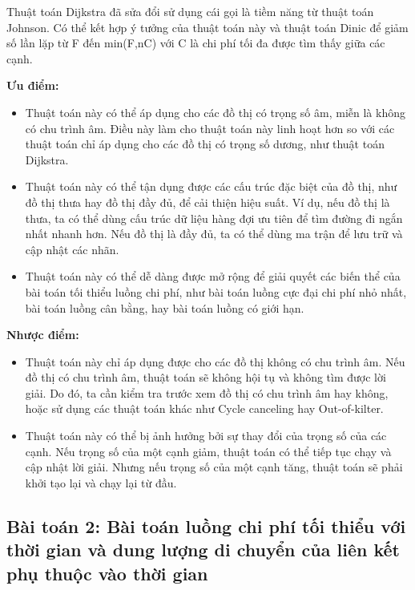 \documentclass[a4paper]{article}
\begin{document}
    Thuật toán Dijkstra đã sửa đổi sử dụng cái gọi là tiềm năng từ thuật toán Johnson. 
    Có thể kết hợp ý tưởng của thuật toán này và thuật toán Dinic để giảm số lần lặp từ F đến min(F,nC) với C là chi phí tối đa được tìm thấy giữa các cạnh.

    \textbf{Ưu điểm:} 
    \begin{itemize}
        \item Thuật toán này có thể áp dụng cho các đồ thị có trọng số âm, miễn là không có chu trình âm. 
            Điều này làm cho thuật toán này linh hoạt hơn so với các thuật toán chỉ áp dụng cho các đồ thị có trọng số dương, như thuật toán Dijkstra.
        \item Thuật toán này có thể tận dụng được các cấu trúc đặc biệt của đồ thị, như đồ thị thưa hay đồ thị đầy đủ, để cải thiện hiệu suất. 
            Ví dụ, nếu đồ thị là thưa, ta có thể dùng cấu trúc dữ liệu hàng đợi ưu tiên để tìm đường đi ngắn nhất nhanh hơn. 
            Nếu đồ thị là đầy đủ, ta có thể dùng ma trận để lưu trữ và cập nhật các nhãn.
        \item Thuật toán này có thể dễ dàng được mở rộng để giải quyết các biến thể của bài toán tối thiểu luồng chi phí, 
        như bài toán luồng cực đại chi phí nhỏ nhất, bài toán luồng cân bằng, hay bài toán luồng có giới hạn.
    \end{itemize}

    \textbf{Nhược điểm:}
    \begin{itemize}
        \item Thuật toán này chỉ áp dụng được cho các đồ thị không có chu trình âm. 
        Nếu đồ thị có chu trình âm, thuật toán sẽ không hội tụ và không tìm được lời giải. 
        Do đó, ta cần kiểm tra trước xem đồ thị có chu trình âm hay không, hoặc sử dụng các thuật toán khác như Cycle canceling hay Out-of-kilter.
        \item Thuật toán này có thể bị ảnh hưởng bởi sự thay đổi của trọng số của các cạnh. 
        Nếu trọng số của một cạnh giảm, thuật toán có thể tiếp tục chạy và cập nhật lời giải. 
        Nhưng nếu trọng số của một cạnh tăng, thuật toán sẽ phải khởi tạo lại và chạy lại từ đầu.
    \end{itemize}

    \subsection{Bài toán 2: Bài toán luồng chi phí tối thiểu với thời gian và dung lượng di chuyển của liên kết phụ thuộc vào thời gian}
\end{document}

